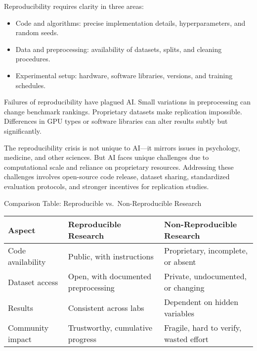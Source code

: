 \documentclass[
  letterpaper,
  DIV=11,
  numbers=noendperiod]{scrreprt}
\providecommand{\tightlist}{%
  \setlength{\itemsep}{0pt}\setlength{\parskip}{0pt}}
\begin{document}
Reproducibility requires clarity in three areas:

\begin{itemize}
\tightlist
\item
  Code and algorithms: precise implementation details, hyperparameters,
  and random seeds.
\item
  Data and preprocessing: availability of datasets, splits, and cleaning
  procedures.
\item
  Experimental setup: hardware, software libraries, versions, and
  training schedules.
\end{itemize}

Failures of reproducibility have plagued AI. Small variations in
preprocessing can change benchmark rankings. Proprietary datasets make
replication impossible. Differences in GPU types or software libraries
can alter results subtly but significantly.

The reproducibility crisis is not unique to AI---it mirrors issues in
psychology, medicine, and other sciences. But AI faces unique challenges
due to computational scale and reliance on proprietary resources.
Addressing these challenges involves open-source code release, dataset
sharing, standardized evaluation protocols, and stronger incentives for
replication studies.

Comparison Table: Reproducible vs.~Non-Reproducible Research

\begin{longtable}[]{@{}
  >{\raggedright\arraybackslash}p{}
  >{\raggedright\arraybackslash}p{}
  >{\raggedright\arraybackslash}p{}@{}}
\toprule\noalign{}
\begin{minipage}[b]{\linewidth}\raggedright
Aspect
\end{minipage} & \begin{minipage}[b]{\linewidth}\raggedright
Reproducible Research
\end{minipage} & \begin{minipage}[b]{\linewidth}\raggedright
Non-Reproducible Research
\end{minipage} \\
\midrule\noalign{}
\endhead
\bottomrule\noalign{}
\endlastfoot
Code availability & Public, with instructions & Proprietary, incomplete,
or absent \\
Dataset access & Open, with documented preprocessing & Private,
undocumented, or changing \\
Results & Consistent across labs & Dependent on hidden variables \\
Community impact & Trustworthy, cumulative progress & Fragile, hard to
verify, wasted effort \\
\end{longtable}
\end{document}
